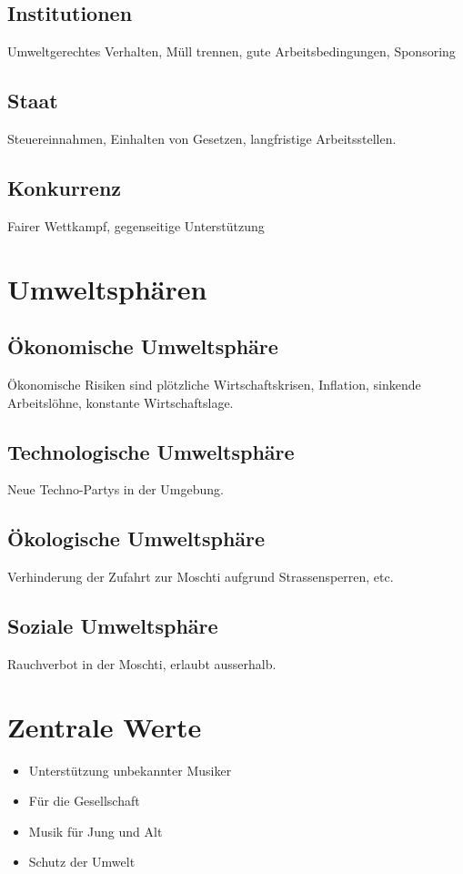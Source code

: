 \documentclass[a4paper, titlepage]{article}
\begin{document}
\subsection{Institutionen}
Umweltgerechtes Verhalten, Müll trennen, gute Arbeitsbedingungen, Sponsoring
\subsection{Staat}
Steuereinnahmen, Einhalten von Gesetzen, langfristige Arbeitsstellen.
\subsection{Konkurrenz}
Fairer Wettkampf, gegenseitige Unterstützung

\section{Umweltsphären}
\subsection{Ökonomische Umweltsphäre}
Ökonomische Risiken sind plötzliche Wirtschaftskrisen, Inflation, sinkende Arbeitslöhne, 
konstante Wirtschaftslage.
\subsection{Technologische Umweltsphäre}
Neue Techno-Partys in der Umgebung.
\subsection{Ökologische Umweltsphäre}
Verhinderung der Zufahrt zur Moschti aufgrund Strassensperren, etc.
\subsection{Soziale Umweltsphäre}
Rauchverbot in der Moschti, erlaubt ausserhalb. 
\section{Zentrale Werte}
\begin{itemize}
  \item Unterstützung unbekannter Musiker
  \item Für die Gesellschaft
  \item Musik für Jung und Alt
  \item Schutz der Umwelt
\end{itemize}
\end{document}
